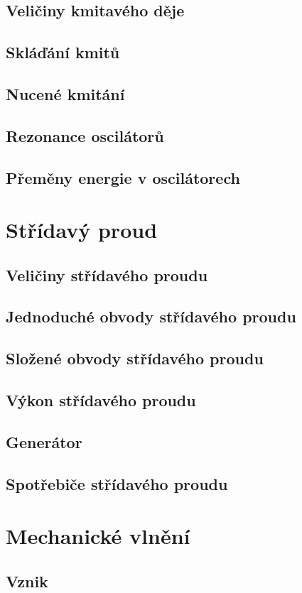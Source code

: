 \documentclass[titlepage]{book}
\begin{document}
\section{Veličiny kmitavého děje}
\section{Skláďání kmitů}
\section{Nucené kmitání}
\section{Rezonance oscilátorů}
\section{Přeměny energie v oscilátorech}
\chapter{Střídavý proud}
\section{Veličiny střídavého proudu}
\section{Jednoduché obvody střídavého proudu}
\section{Složené obvody střídavého proudu}
\section{Výkon střídavého proudu}
\section{Generátor}
\section{Spotřebiče střídavého proudu}
\chapter{Mechanické vlnění}
\section{Vznik}
\end{document}
